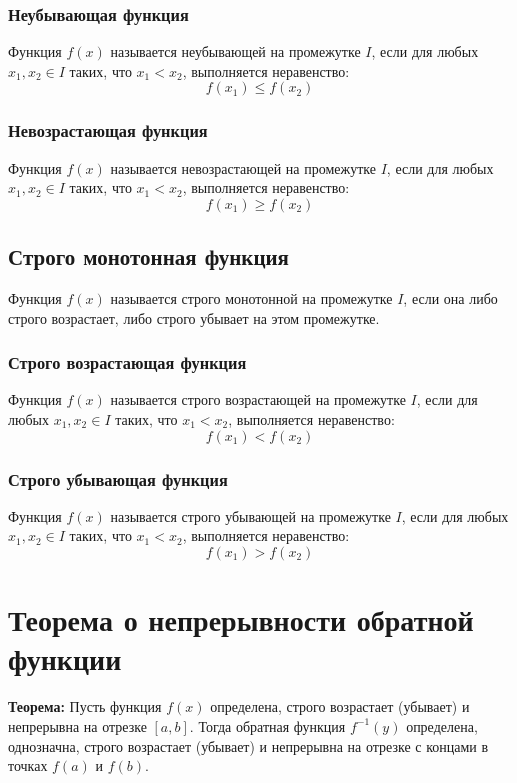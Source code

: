 \documentclass{article}
\begin{document}
\subsubsection*{Неубывающая функция}
Функция \( f(x) \) называется неубывающей на промежутке \( I \), если для любых \( x_1, x_2 \in I \) таких, что \( x_1 < x_2 \), выполняется неравенство:
\[
f(x_1) \leq f(x_2)
\]

\subsubsection*{Невозрастающая функция}
Функция \( f(x) \) называется невозрастающей на промежутке \( I \), если для любых \( x_1, x_2 \in I \) таких, что \( x_1 < x_2 \), выполняется неравенство:
\[
f(x_1) \geq f(x_2)
\]

\subsection*{Строго монотонная функция}
Функция \( f(x) \) называется строго монотонной на промежутке \( I \), если она либо строго возрастает, либо строго убывает на этом промежутке.

\subsubsection*{Строго возрастающая функция}
Функция \( f(x) \) называется строго возрастающей на промежутке \( I \), если для любых \( x_1, x_2 \in I \) таких, что \( x_1 < x_2 \), выполняется неравенство:
\[
f(x_1) < f(x_2)
\]

\subsubsection*{Строго убывающая функция}
Функция \( f(x) \) называется строго убывающей на промежутке \( I \), если для любых \( x_1, x_2 \in I \) таких, что \( x_1 < x_2 \), выполняется неравенство:
\[
f(x_1) > f(x_2)
\]

\section*{Теорема о непрерывности обратной функции}

\textbf{Теорема:} Пусть функция \( f(x) \) определена, строго возрастает (убывает) и непрерывна на отрезке \([a, b]\). Тогда обратная функция \( f^{-1}(y) \) определена, однозначна, строго возрастает (убывает) и непрерывна на отрезке с концами в точках \( f(a) \) и \( f(b) \).
\end{document}
